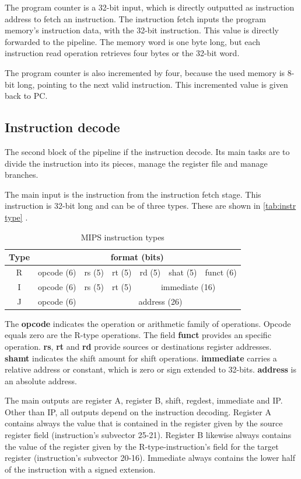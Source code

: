 The program counter is a 32-bit input, which is directly outputted as instruction address to fetch an instruction. The instruction fetch inputs the program memory's instruction data, 
with the 32-bit instruction. This value is directly forwarded to the pipeline. The memory word is one byte long, but each instruction read operation retrieves four bytes or the 32-bit
word.

The program counter is also incremented by four, because the used memory is 8-bit long, pointing to the next valid instruction. This incremented value is given back to PC.
\subsection{Instruction decode}
The second block of the pipeline if the instruction decode. Its main tasks are to divide the instruction into its pieces, manage the register file and manage branches.

The main input is the instruction from the instruction fetch stage. This instruction is 32-bit long and can be of three types. These are shown in \autoref{tab:instr type} \cite{mips32}.

\begin{table}[h!]
	\centering
	 \caption{MIPS instruction types}	
	\begin{tabular}{ccccccc}
		\toprule[2pt]
		\textbf{Type} & \multicolumn{6}{c}{\textbf{format (bits) }}   \\
		\toprule[2pt]
		R & opcode (6) & rs (5) & rt (5)   & rd (5) & shat (5) & funct (6) \\
		I & opcode (6) & rs (5) & rt (5)   & \multicolumn{3}{c}{ immediate (16)} \\
		J & opcode (6) & \multicolumn{5}{c}{ address (26)} \\	
		\bottomrule[2pt]
	\end{tabular} 
	\label{tab:instr type}
\end{table}

The \textbf{opcode} indicates the operation or arithmetic family of operations. Opcode equals zero are the R-type operations. The field \textbf{funct} provides an specific operation.
\textbf{rs}, \textbf{rt} and \textbf{rd} provide sources or destinations register addresses. \textbf{shamt} indicates the shift amount for shift operations. \textbf{immediate} carries
a relative address or constant, which is zero or sign extended to 32-bits. \textbf{address} is an absolute address.

The main outputs are register A, register B, shift, regdest, immediate and IP. Other than IP, all outputs depend on the instruction decoding. 
Register A contains always the value that is contained in the register given by the source register field (instruction's subvector 25-21). 
Register B likewise always contains the value of the register given by the R-type-instruction's field for the target register (instruction's subvector 20-16). 
Immediate always contains the lower half of the instruction with a signed extension. 

